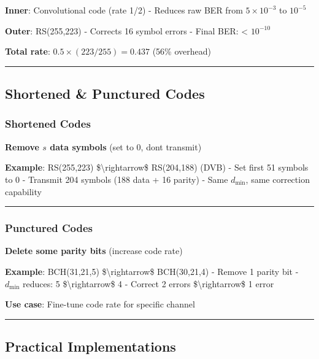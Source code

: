 \textbf{Inner}: Convolutional code (rate 1/2) - Reduces raw BER from
\(5 \times 10^{-3}\) to \(10^{-5}\)

\textbf{Outer}: RS(255,223) - Corrects 16 symbol errors - Final BER:
\textless{} \(10^{-10}\)

\textbf{Total rate}: \(0.5 \times (223/255) = 0.437\) (56\% overhead)

\begin{center}\rule{0.5\linewidth}{0.5pt}\end{center}

\subsection{Shortened \& Punctured
Codes}\label{shortened-punctured-codes}

\subsubsection{Shortened Codes}\label{shortened-codes}

\textbf{Remove \(s\) data symbols} (set to 0, don\textquotesingle t
transmit)

\textbf{Example}: RS(255,223) \$\textbackslash rightarrow\$ RS(204,188)
(DVB) - Set first 51 symbols to 0 - Transmit 204 symbols (188 data + 16
parity) - Same \(d_{\min}\), same correction capability

\begin{center}\rule{0.5\linewidth}{0.5pt}\end{center}

\subsubsection{Punctured Codes}\label{punctured-codes}

\textbf{Delete some parity bits} (increase code rate)

\textbf{Example}: BCH(31,21,5) \$\textbackslash rightarrow\$
BCH(30,21,4) - Remove 1 parity bit - \(d_{\min}\) reduces: 5
\$\textbackslash rightarrow\$ 4 - Correct 2 errors
\$\textbackslash rightarrow\$ 1 error

\textbf{Use case}: Fine-tune code rate for specific channel

\begin{center}\rule{0.5\linewidth}{0.5pt}\end{center}

\subsection{Practical Implementations}\label{practical-implementations}

